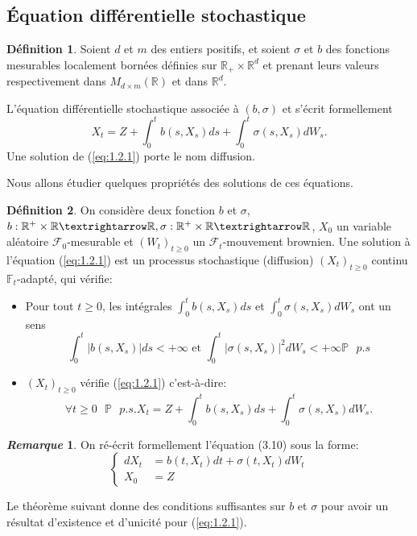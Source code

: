 \documentclass[12pt,a4paper,twoside]{book}%
\theoremstyle{definition}
\newtheorem{dfn}{Définition}[section]
\newtheorem{rem}{\textit{Remarque}}[section]
\numberwithin{equation}{section}
\begin{document}
\subsection{Équation différentielle stochastique}
\begin{dfn}
Soient $d$ et $m$ des entiers positifs, et soient $\sigma$ et $b$ des fonctions mesurables localement bornées définies sur $\mathbb{R}_+\times\mathbb{R}^d$ et prenant leurs valeurs respectivement dans $M_{d\times m}(\mathbb{R})$ et dans $\mathbb{R}^d$.

L'équation différentielle stochastique associée à $(b,\sigma)$ et s'écrit formellement
\begin{equation}\label{eq:1.2.1}
X_t = Z+\int_{0}^{t}b(s,X_s)ds +\int_{0}^{t}\sigma(s,X_s)dW_s.
\end{equation}
Une solution de (\ref{eq:1.2.1}) porte le nom diffusion.
\end{dfn}
 Nous allons étudier quelques propriétés des solutions de ces équations.
 \begin{dfn}
 On considère deux fonction $b$ et $\sigma$, $b:\mathbb{R}^+\times\mathbb{R}\textrightarrow \mathbb{R},\sigma:\mathbb{R}^+\times\mathbb{R}\textrightarrow \mathbb{R}$, $X_0$ un variable aléatoire $\mathcal{F}_0$-mesurable et $(W_t)_{t\geq0}$ un $\mathcal{F}_t$-mouvement brownien. Une solution à l'équation (\ref{eq:1.2.1}) est un processus stochastique (diffusion) $(X_t)_{t\geq0}$ continu $\mathbb{F}_t$-adapté, qui vérifie:
 \begin{itemize}
 	\item Pour tout $t\geq0$, les intégrales $\int_{0}^{t}b(s,X_s)ds$ et $\int_{0}^{t}\sigma(s,X_s)dW_s$ ont un sens
 	\[
 	\int_{0}^{t}|b(s,X_s)|ds<+\infty\text{ et }\int_{0}^{t}|\sigma(s,X_s)|^2dW_s<+\infty \mathbb{P}\text{  }p.s
 	\]
 	\item $(X_t)_{t\geq0}$ vérifie (\ref{eq:1.2.1}) c'est-à-dire:
 	\[
 	\forall t\geq0\text{    }\mathbb{P}\text{    }p.s. X_t=Z+\int_{0}^{t}b(s,X_s)ds +\int_{0}^{t}\sigma(s,X_s)dW_s.
 	\]
 \end{itemize}
 \end{dfn}
 \begin{rem}
 	On ré-écrit formellement l'équation (3.10) sous la forme:
 	\[
 	\begin{cases}
 		dX_t &= b(t, X_t)dt + \sigma(t, X_t)dW_t \\
 		X_0 &= Z
 	\end{cases}
 	\]
 \end{rem}
Le théorème suivant donne des conditions suffisantes sur \( b \) et \( \sigma \) pour avoir un résultat d’existence et d’unicité pour (\ref{eq:1.2.1}).
\end{document}
